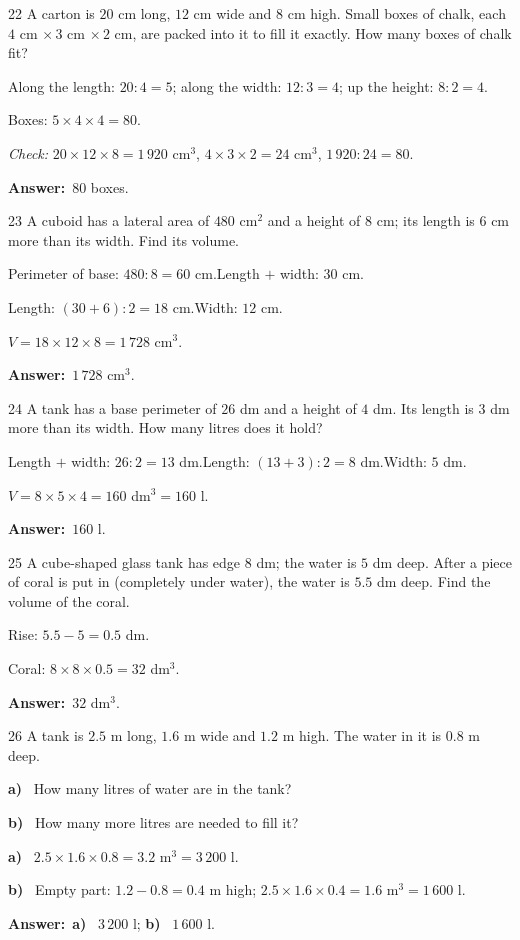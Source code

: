 \documentclass[11pt]{article}
\newif\ifsol \solfalse
\providecommand{\AnsWord}{Đáp số}
\newcommand{\dapso}[1]{\par\textbf{\AnsWord:}\ #1}
\newcommand{\probsol}[1]{%
  \begin{lrbox}{\solmeasure}\begin{minipage}{\dimexpr\linewidth-24pt\relax}#1\end{minipage}\end{lrbox}%
  \ifsol
    \begin{solbox}#1\end{solbox}%
  \else
    \setlength{\solht}{\dimexpr\ht\solmeasure+\dp\solmeasure+0.85cm\relax}%
    \ifdim\solht<1.35cm\setlength{\solht}{1.35cm}\fi
    \begin{tcolorbox}[colback=white,colframe=Line,boxrule=0.8pt,arc=5pt,
      left=8pt,right=8pt,top=4pt,bottom=4pt,height=\solht]{\footnotesize\color{Slate}\itshape\WorkWord}\end{tcolorbox}%
  \fi}
\newcommand{\pa}[1]{\textbf{#1)}\ }
\newcommand{\gap}{\vspace{0.3cm}}
\def\WorkWord{Your work:}
\def\AnsWord{Answer}
\begin{document}
\gap
\begin{probbox}{22}{\relax}
A carton is $20$ cm long, $12$ cm wide and $8$ cm high. Small boxes of chalk, each $4$ cm $\times\,3$ cm $\times\,2$ cm, are packed into it to fill it exactly. How many boxes of chalk fit?
\end{probbox}
\probsol{
Along the length: $20:4=5$; along the width: $12:3=4$; up the height: $8:2=4$.\par
Boxes: $5\times4\times4=80$.\par
\emph{Check:} $20\times12\times8=1\,920$ cm$^3$, $4\times3\times2=24$ cm$^3$, $1\,920:24=80$.
\dapso{$80$ boxes.}}
\gap
\begin{probbox}{23}{\relax}
A cuboid has a lateral area of $480$ cm$^2$ and a height of $8$ cm; its length is $6$ cm more than its width. Find its volume.
\end{probbox}
\probsol{
Perimeter of base: $480:8=60$ cm.\quad Length $+$ width: $30$ cm.\par
Length: $(30+6):2=18$ cm.\quad Width: $12$ cm.\par
$V=18\times12\times8=1\,728$ cm$^3$.
\dapso{$1\,728$ cm$^3$.}}
\gap
\begin{probbox}{24}{\relax}
A tank has a base perimeter of $26$ dm and a height of $4$ dm. Its length is $3$ dm more than its width. How many litres does it hold?
\end{probbox}
\probsol{
Length $+$ width: $26:2=13$ dm.\quad Length: $(13+3):2=8$ dm.\quad Width: $5$ dm.\par
$V=8\times5\times4=160$ dm$^3=160$ l.
\dapso{$160$ l.}}
\gap
\begin{probbox}{25}{\relax}
A cube-shaped glass tank has edge $8$ dm; the water is $5$ dm deep. After a piece of coral is put in (completely under water), the water is $5.5$ dm deep. Find the volume of the coral.
\end{probbox}
\probsol{
Rise: $5.5-5=0.5$ dm.\par
Coral: $8\times8\times0.5=32$ dm$^3$.
\dapso{$32$ dm$^3$.}}
\gap
\begin{probbox}{26}{\relax}
A tank is $2.5$ m long, $1.6$ m wide and $1.2$ m high. The water in it is $0.8$ m deep.\par
\pa{a} How many litres of water are in the tank?\par
\pa{b} How many more litres are needed to fill it?
\end{probbox}
\probsol{
\pa{a} $2.5\times1.6\times0.8=3.2$ m$^3=3\,200$ l.\par
\pa{b} Empty part: $1.2-0.8=0.4$ m high; $2.5\times1.6\times0.4=1.6$ m$^3=1\,600$ l.
\dapso{\pa{a} $3\,200$ l; \pa{b} $1\,600$ l.}}
\end{document}
